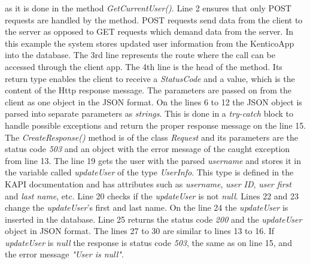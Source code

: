as it is done in the method \textit{GetCurrentUser()}.
Line 2 ensures that only POST requests are handled by the method. POST requests send data from the client to the server as opposed to GET requests which demand data from the server. In this example the system stores updated user information from the KenticoApp into the database. The 3rd line represents the route where the call can be accessed through the client app. The 4th line is the head of the method. Its return type enables the client to receive a \textit{StatusCode} and a value, which is the content of the Http response message. The parameters are passed on from the client as one object in the JSON format. On the lines 6 to 12 the JSON object is parsed into separate parameters as \textit{strings}. This is done in a \textit{try-catch} block to handle possible exceptions and return the proper response message on the line 15. The \textit{CreateResponse()} method is of the class \textit{Request} and its parameters are the status code \textit{503} and an object with the error message of the caught exception from line 13. The line 19 gets the user with the parsed \textit{username} and stores it in the variable called \textit{updateUser} of the type \textit{UserInfo}. This type is defined in the KAPI documentation and has attributes such as \textit{username}, \textit{user ID}, \textit{user first} and \textit{last name}, etc. Line 20 checks if the \textit{updateUser} is not \textit{null}. Lines 22 and 23 change the \textit{updateUser}'s first and last name. On the line 24 the \textit{updateUser} is inserted in the database. Line 25 returns the status code \textit{200} and the \textit{updateUser} object in JSON format. The lines 27 to 30 are similar to lines 13 to 16. If \textit{updateUser} is \textit{null} the response is status code \textit{503}, the same as on line 15, and the error message \textit{"User is null"}. 

